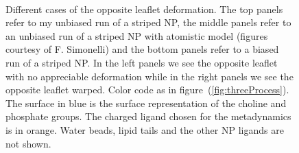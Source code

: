 \begin{figure}[ht!]
{		}\ %
		\caption{Different cases of the opposite leaflet deformation. The top panels refer to my unbiased run of a striped \ac{NP}, the middle panels refer to an unbiased run of a striped \ac{NP} with atomistic model (figures courtesy of F. Simonelli) and the bottom panels refer to a biased run of a striped \ac{NP}. In the left panels we see the opposite leaflet with no appreciable deformation while in the right panels we see the opposite leaflet warped. Color code as in figure~(\ref{fig:threeProcess}). The surface in blue is the surface representation of the choline and phosphate groups. The charged ligand chosen for the metadynamics is in orange. Water beads, lipid tails and the other \acs{NP} ligands are not shown.}%
		\label{fig:engulfmentFrame}
\end{figure}


